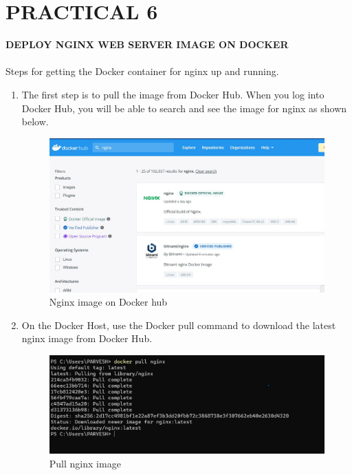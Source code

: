 \documentclass[12pt]{article}
\begin{document}
\clearpage

\section{PRACTICAL 6}

\textbf{\uppercase {Deploy Nginx Web Server Image on Docker}} \\
\vspace{0.1\baselineskip} \\

 Steps for getting the Docker container for nginx up and running.
 
 \begin{enumerate}
 \item The first step is to pull the image from Docker Hub. When you log into Docker Hub, you will be able to search and see the image for nginx as shown below.
 
\begin{figure}[H]
\centering
\includegraphics[scale=0.5]{fig15}
\caption{Nginx image on Docker hub}
\vspace{0.6\baselineskip}
\end{figure}	
 
 \item On the Docker Host, use the Docker pull command to download the latest nginx image from Docker Hub.
 
\begin{figure}[H]
\centering
\includegraphics[scale=0.6]{fig16}
\caption{Pull nginx image}
\vspace{0.6\baselineskip}
\end{figure}	
 

\end{enumerate}
\end{document}
